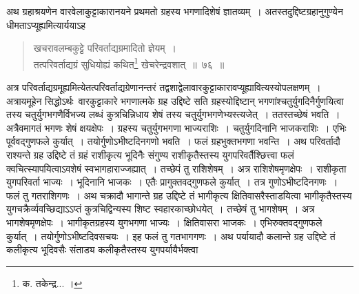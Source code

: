 \documentclass[11pt, openany]{book}
\begin{document}
\indent
अथ ग्रहाश्रयणेन वारवेलाकुट्टाकारानयने प्रथमतो ग्रहस्य भगणादिशेषं
ज्ञातव्यम्~। अतस्तदुद्दिष्टग्रहानुगुण्येन धीमताऽप्यूह्यमित्यार्ययाऽह\textendash

\begin{quote}
{\ks खचरावलम्बकुट्टे परिवर्ताद्यग्रमादितो ज्ञेयम्~।\\
तत्परिवर्ताद्यग्रं सुधियोह्यं कथित\renewcommand\thefootnote{१}\footnote{क. तकेन्द्र... ।} खेचरेन्द्रवशात्~॥~७६~॥}
\end{quote}

\indent
अत्र परिवर्ताद्यग्रमूह्यमित्येतत्परिवर्ताद्यग्रेणानन्तरं तद्वशाद्वेलावारकुट्टाकारावप्यूह्यावित्यस्योपलक्षणम्~। अत्रायमूहेन सिद्धोऽर्थः\textendash\ वारकुट्टाकारे भगणात्मके ग्रह उद्दिष्टे सति ग्रहस्योद्दिष्टान्
भगणांश्चतुर्युगदिनैर्गुणयित्वा तस्य चतुर्युगभगणैर्विभज्य लब्धं कुत्रचिन्निधाय शेषं तस्य
चतुर्युगभगणेभ्यस्त्यजेत्~। ततस्तच्छेषं भवति~। अत्रैवमागतं भगणः शेषं क्षयक्षेपः~। ग्रहस्य
चतुर्युगभगणा भाज्यराशिः~। चतुर्युगदिनानि भाजकराशिः~। एभिः पूर्ववद्गुणफले कुर्यात्~। तयोर्गुणोऽभीष्टदिनगणो भवति~। फलं ग्रहभुक्तभगणा भवन्ति~। अथ परिवर्तादौ राश्यन्ते ग्रह उद्दिष्टे तं ग्रहं राशीकृत्य भूदिनैः संगुण्य राशीकृतैस्तस्य युगपरिवर्तैश्छित्त्वा फलं क्वचित्स्यापयित्वाऽवशेषं स्वभागहाराज्जह्यात्~। तच्छेपं तु राशिशेषम्~। अत्र राशिशेषमृणक्षेपः~। राशीकृता युगपरिवर्ता भाज्यः~। भूदिनानि भाजकः~। एतैः प्रागुक्तवद्गुणफले कुर्यात्~। तत्र गुणोऽभीष्टदिनगणः~। फलं तु गतराशिगणः~। अथ चक्रादौ भागान्ते ग्रह उद्दिष्टे तं भागीकृत्य क्षितिवासरैस्ताडयित्वा भागीकृतैस्तस्य युगचक्रैर्व्यवच्छिद्याऽऽप्तं कुत्रचिद्विन्यस्य शिष्ट स्वहारकाच्छोधयेत्~। तच्छेषं तु भागशेषम्~। अत्र भागशेषमृणक्षेपः~। भागीकृतग्रहस्य युगभगणा भाज्यः~। क्षितिवासरा भाजकः~। एभिरुक्तवद्गुणफले कुर्यात्~। तयोर्गुणोऽभीष्टदिवसचयः~। इह फलं तु गतभागगणः~। अथ पर्यायादौ कलान्ते ग्रह उद्दिष्टे तं कलीकृत्य भूदिवसैः संताड्य कलीकृतैस्तस्य युगपर्यायैर्भक्त्वा

\newpage
\thispagestyle{fancy}
\fancyhf{}
\end{document}
